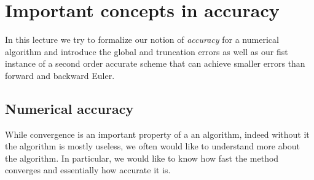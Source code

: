 \chapter{Important concepts in accuracy}

In this lecture we try to formalize our notion of {\it accuracy}
for a numerical algorithm and introduce the global and truncation 
errors as well as our fist instance of a second order 
accurate scheme that can achieve smaller errors than 
forward and backward Euler.

\section{Numerical accuracy}

While convergence is an important property of a an algorithm, 
indeed without it the algorithm is mostly useless, we often 
would like to understand more about the algorithm. 
In particular, we would like to know how fast the method 
converges and essentially how accurate it is. 

